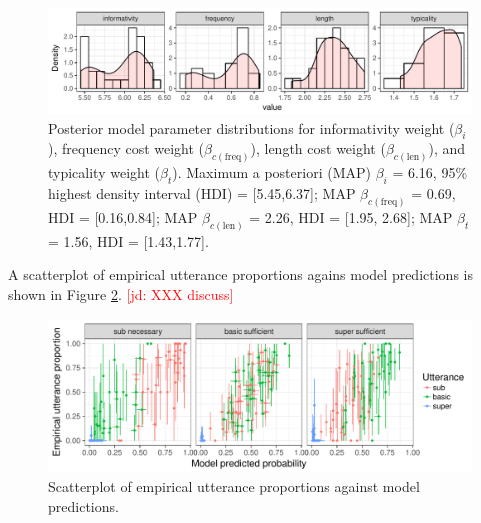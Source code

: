 \documentclass[11pt]{article}
\newcommand{\jd}[1]{\textcolor{Red}{[jd: #1]}}
\newcommand{\figref}[1]{Figure \ref{#1}}
\begin{document}
\begin{figure}
\centering
\includegraphics[width=\textwidth]{pics/exp3-paramposteriors}
\caption{Posterior model parameter distributions for informativity weight ($\beta_i$), frequency cost weight  ($\beta_{c(\textrm{freq})}$), length cost weight ($\beta_{c(\textrm{len})}$), and typicality weight ($\beta_t $). Maximum a posteriori (MAP)  $\beta_i$ = 6.16, 95\% highest density interval (HDI) = [5.45,6.37]; MAP $\beta_{c(\textrm{freq})}$ = 0.69, HDI = [0.16,0.84]; MAP $\beta_{c(\textrm{len})}$ = 2.26, HDI = [1.95, 2.68]; MAP $\beta_t $ = 1.56, HDI = [1.43,1.77].}
\label{fig:nomparamposteriors}
\end{figure}

A scatterplot of empirical utterance proportions agains model predictions is shown in \figref{fig:nompredictives}. \jd{XXX discuss}


\begin{figure}
\centering
\includegraphics[width=\textwidth]{pics/exp3-empirical-predictives}
\caption{Scatterplot of empirical utterance proportions against model predictions.}
\label{fig:nompredictives}
\end{figure}





\end{document}
